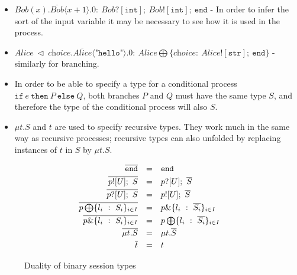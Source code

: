 \documentclass[12pt,twoside]{report}
\begin{document}
\begin{itemize}
    \item $\textit{Bob}(x).\overline{\textit{Bob}} \langle x + 1 \rangle.0:\ \textit{Bob}?[\texttt{int}];\ \textit{Bob}![\texttt{int}];\ \texttt{end}$ - In order to infer the sort of the input variable it may be necessary to see how it is used in the process.
    \item $\textit{Alice}\ \triangleleft\ \textit{choice}.\overline{\textit{Alice}} \langle \texttt{"hello"} \rangle.0:\ \textit{Alice} \bigoplus \{\textit{choice}:\ \textit{Alice}![\texttt{str}];\ \texttt{end}\}$ - similarly for branching.
    \item In order to be able to specify a type for a conditional process $\texttt{if}\ e\ \texttt{then}\ P\ \texttt{else}\ Q$, both branches $P$ and $Q$ must have the same type $S$, and therefore the type of the conditional process will also $S$.
    \item $\mu t.S$ and $t$ are used to specify recursive types. They work much in the same way as recursive processes; recursive types can also unfolded by replacing instances of $t$ in $S$ by $\mu t.S$.
\end{itemize} 

\begin{figure}[h!]
    \centering
    \begin{equation*}
    \centering
    \begin{array}{rcl}
             \overline{\texttt{end}} & = & \texttt{end}  \\[2.75pt]
             \overline{p![U];\ S} & = & p?[U];\ \overline{S} \\[2.75pt]
             \overline{p?[U];\ S} & = & p![U];\ \overline{S} \\[2.75pt]
             \overline{p \bigoplus \{l_i\ :\ S_i\}_{i \in I}} & = & p \& \{l_i\ :\ \overline{S_i}\}_{i \in I}\\[2.75pt]
             \overline{p \& \{l_i\ :\ S_i\}_{i \in I}} & = & p \bigoplus \{l_i\ :\ \overline{S_i}\}_{i \in I}\\[2.75pt]
             \overline{\mu t.S} & = & \mu t.\overline{S}\\[2.75pt]
             \overline{t} & = & t
        \end{array}
    \end{equation*}
    \caption{Duality of binary session types}
    \label{bst_duality}
\end{figure}{}
\end{document}
